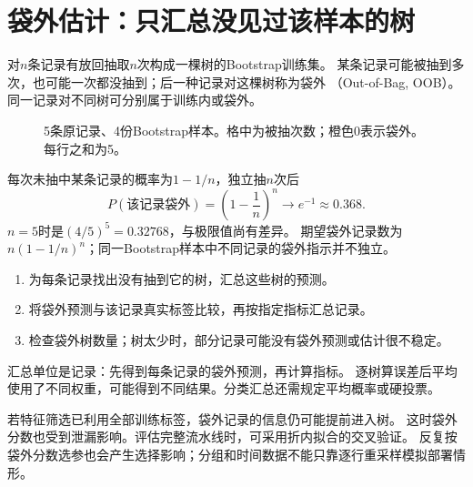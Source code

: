\section{袋外估计：只汇总没见过该样本的树}
\label{sec:tree-oob}
对$n$条记录有放回抽取$n$次构成一棵树的Bootstrap训练集。
某条记录可能被抽到多次，也可能一次都没抽到；后一种记录对这棵树称为袋外
（Out-of-Bag, OOB）。同一记录对不同树可分别属于训练内或袋外。

\begin{figure}[htbp]
\centering
\caption{5条原记录、4份Bootstrap样本。格中为被抽次数；橙色0表示袋外。每行之和为5。}
\par\smallskip
{}
\end{figure}

每次未抽中某条记录的概率为$1-1/n$，独立抽$n$次后
\[
 P(\text{该记录袋外})=\left(1-\frac1n\right)^n\longrightarrow e^{-1}\approx0.368.
\]
$n=5$时是$(4/5)^5=0.32768$，与极限值尚有差异。
期望袋外记录数为$n(1-1/n)^n$；同一Bootstrap样本中不同记录的袋外指示并不独立。

\begin{enumerate}
\item 为每条记录找出没有抽到它的树，汇总这些树的预测。
\item 将袋外预测与该记录真实标签比较，再按指定指标汇总记录。
\item 检查袋外树数量；树太少时，部分记录可能没有袋外预测或估计很不稳定。
\end{enumerate}
汇总单位是记录：先得到每条记录的袋外预测，再计算指标。
逐树算误差后平均使用了不同权重，可能得到不同结果。分类汇总还需规定平均概率或硬投票。

\begin{pitfall}[预处理也要保持袋外信息边界]
若特征筛选已利用全部训练标签，袋外记录的信息仍可能提前进入树。
这时袋外分数也受到泄漏影响。评估完整流水线时，可采用折内拟合的交叉验证。
反复按袋外分数选参也会产生选择影响；分组和时间数据不能只靠逐行重采样模拟部署情形。
\end{pitfall}
